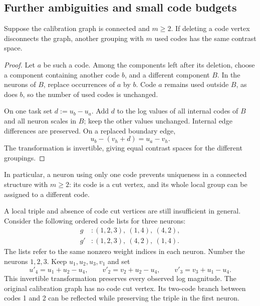 \subsection{Further ambiguities and small code budgets}
\label{app:theory-obstructions}

\begin{proposition}
    \label{prop:theory-code-cut}
    Suppose the calibration graph is connected and $m\ge2$.
    If deleting a code vertex disconnects the graph, another
    grouping with $m$ used codes has the same contrast space.
\end{proposition}

\begin{proof}
    Let $a$ be such a code. Among the components left after its
    deletion, choose a component containing another code $b$,
    and a different component $B$.
    In the neurons of $B$, replace occurrences of $a$ by $b$.
    Code $a$ remains used outside $B$, as does $b$, so the
    number of used codes is unchanged.

    On one task set
    $d:=u_b-u_a$. Add $d$ to the log values of all internal
    codes of $B$ and all neuron scales in $B$; keep the other
    values unchanged. Internal edge differences are preserved.
    On a replaced boundary edge,
    $$
        u_b-(v_h+d)=u_a-v_h.
    $$
    The transformation is invertible, giving equal contrast spaces
    for the different groupings.
\end{proof}

In particular, a neuron using only one code prevents uniqueness
in a connected structure with $m\ge2$: its code is a cut vertex,
and its whole local group can be assigned to a different code.

A local triple and absence of code cut vertices are still
insufficient in general. Consider the following ordered code lists
for three neurons:
$$
    \begin{aligned}
        g &: (1,2,3),\ (1,4),\ (4,2),\\
        g' &: (1,2,3),\ (4,2),\ (1,4).
    \end{aligned}
$$
The lists refer to the same nonzero weight indices in each neuron.
Number the neurons $1,2,3$. Keep $u_1,u_2,u_3,v_1$ and set
\[
    u'_4=u_1+u_2-u_4,\qquad
    v'_2=v_2+u_2-u_4,\qquad v'_3=v_3+u_1-u_4 .
\]
This invertible transformation preserves every observed log magnitude.
The original calibration graph has no code cut vertex.
Its two-code branch between codes 1 and 2 can be reflected while
preserving the triple in the first neuron.

